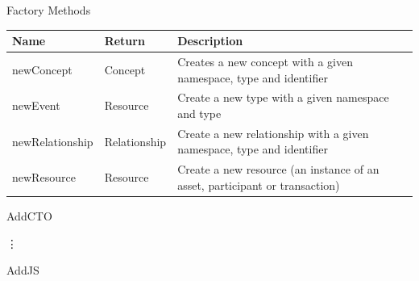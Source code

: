 \documentclass[pdf,table]{beamer}
\begin{document}
\begin{frame}{Factory Methods}
	\begin{tabular}{llp{65mm}} \\
		 Name & Return & Description \\ \hline
			newConcept & Concept & Creates a new concept with a given namespace, type and identifier \\ \hline
			newEvent & Resource & Create a new type with a given namespace and type \\ \hline
			newRelationship & Relationship & Create a new relationship with a given namespace, type and identifier \\ \hline
			newResource & Resource & Create a new resource (an instance of an asset, participant or transaction) \\ \hline
	\end{tabular}
\end{frame}


\begin{frame}{Add}{CTO}
	
	\vdots
	
\end{frame}


\begin{frame}{Add}{JS}
	
\end{frame}
\end{document}
